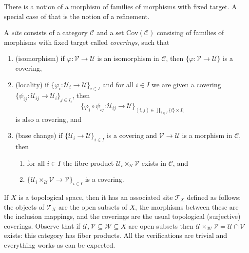 \noindent
There is a notion of a morphism of families of morphisms with fixed target.
A special case of that is the notion of a refinement.

\begin{definition}
\label{definition-site}
A {\it site} consists of a category $\mathcal{C}$ and a set
$\text{Cov}(\mathcal{C})$ consising of families of morphisms with fixed target
called {\it coverings}, such that
\begin{enumerate}
\item (isomorphism) if $\varphi : \mathcal{V} \to \mathcal{U}$ is an
isomorphism in $\mathcal{C}$, then
$\{\varphi : \mathcal{V} \to \mathcal{U}\}$ is a covering,
\item (locality) if $\{\varphi_i : \mathcal{U}_i \to \mathcal{U} \}_{i\in I}$
and for all $i \in I$ we are given a covering
$\{\psi_{ij} : \mathcal{U}_{ij} \to \mathcal{U}_i \}_{j\in I_i}$, then
$$
\{\varphi_i \circ \psi_{ij} : \mathcal{U}_{ij} \to
\mathcal{U} \}_{(i,j)\in \prod_{i\in I} \{i\} \times I_i}
$$
is also a covering, and
\item (base change) if $\{\mathcal{U}_i \to \mathcal{U} \}_{i\in I}$
is a covering and $\mathcal{V} \to \mathcal{U}$ is a morphism in
$\mathcal{C}$, then
\begin{enumerate}
\item for all $i \in I$ the fibre product
$\mathcal{U}_i \times_\mathcal{U} \mathcal{V}$ exists in $\mathcal{C}$, and
\item $\{\mathcal{U}_i \times_\mathcal{U} \mathcal{V} \to \mathcal{V} \}_{i\in
I}$ is a covering.
\end{enumerate}
\end{enumerate}
\end{definition}

\begin{example}
\label{example-site-topological-space}
If $X$ is a topological space, then it has an associated site $\mathcal{T}_X$
defined as follows: the objects of $\mathcal{T}_X$ are the open subsets of $X$,
the morphisms between these are the inclusion mappings, and the coverings are
the usual topological (surjective) coverings. Observe that if $\mathcal{U},
\mathcal{V} \subseteq \mathcal{W} \subseteq X$ are open subsets then
$\mathcal{U} \times_\mathcal{W} \mathcal{V} = \mathcal{U} \cap \mathcal{V}$
exists: this category has fiber products. All the verifications are trivial and
everything works as can be expected.
\end{example}




